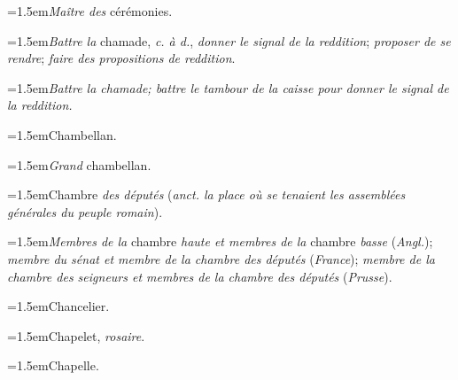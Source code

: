 \par{\dictfontsize\hangindent=1.5em\noindent \textit{Maître des} cérémonies. \par}
\par{\dictfontsize\hangindent=1.5em\noindent \textit{Battre la} chamade, \textit{c. à d.}, \textit{donner le signal de la reddition}; \textit{proposer de se rendre}; \textit{faire des propositions de reddition}. \par}
\par{\dictfontsize\hangindent=1.5em\noindent \textit{Battre la chamade; battre le tambour de la caisse pour donner le signal de la reddition.} \par}
\par{\dictfontsize\hangindent=1.5em\noindent Chambellan. \par}
\par{\dictfontsize\hangindent=1.5em\noindent \textit{Grand} chambellan. \par}
\par{\dictfontsize\hangindent=1.5em\noindent Chambre \textit{des députés} (\textit{anct. la place où se tenaient les assemblées générales du peuple romain}). \par}
\par{\dictfontsize\hangindent=1.5em\noindent \textit{Membres de la} chambre \textit{haute et membres de la} chambre \textit{basse} (\textit{Angl.}); \textit{membre du sénat et membre de la chambre des députés} (\textit{France}); \textit{membre de la chambre des seigneurs et membres de la chambre des députés} (\textit{Prusse}). \par}
\par{\dictfontsize\hangindent=1.5em\noindent Chancelier. \par}
\par{\dictfontsize\hangindent=1.5em\noindent Chapelet, \textit{rosaire}. \par}
\par{\dictfontsize\hangindent=1.5em\noindent Chapelle. \par}
